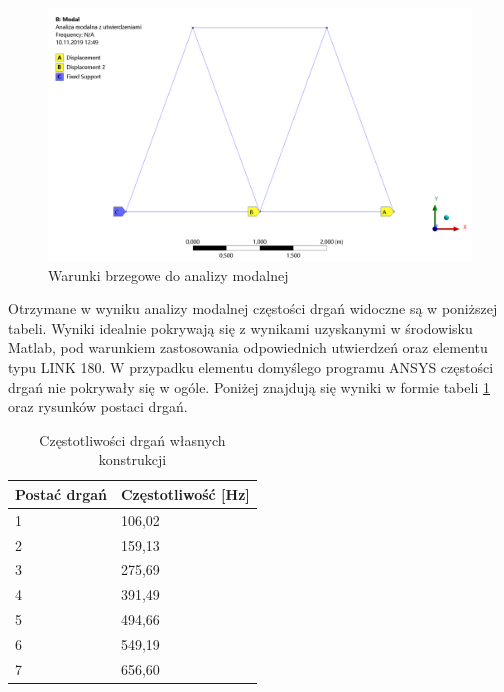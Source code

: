 \documentclass[12pt, a4papper, twoside]{article}
\begin{document}
\begin{figure}[H]
    \centering
    \includegraphics[width=\textwidth, height=0.6\textwidth]{modalsettings.png}
    \caption{Warunki brzegowe do analizy modalnej}
    \label{rys:warbrzegmodal}
\end{figure}

Otrzymane w wyniku analizy modalnej częstości drgań widoczne są w poniższej tabeli. Wyniki idealnie pokrywają się z wynikami uzyskanymi w środowisku Matlab, pod warunkiem zastosowania odpowiednich utwierdzeń oraz elementu typu LINK 180. W przypadku elementu domyślego programu ANSYS częstości drgań nie pokrywały się w ogóle. Poniżej znajdują się wyniki w formie tabeli \ref{tab:czestansys} oraz rysunków postaci drgań.

\begin{table}[H]
    \caption{Częstotliwości drgań własnych konstrukcji}
    \centering
    \label{tab:czestansys}
    \begin{tabular}{|l|l|}
    \hline
    Postać drgań & Częstotliwość {[}Hz{]} \\ \hline
    1            & 106,02                  \\ \hline
    2            & 159,13                 \\ \hline
    3            & 275,69                 \\ \hline
    4            & 391,49                 \\ \hline
    5            & 494,66                 \\ \hline
    6            & 549,19                 \\ \hline
    7            & 656,60                 \\ \hline
    
    \end{tabular}
\end{table}
\end{document}
